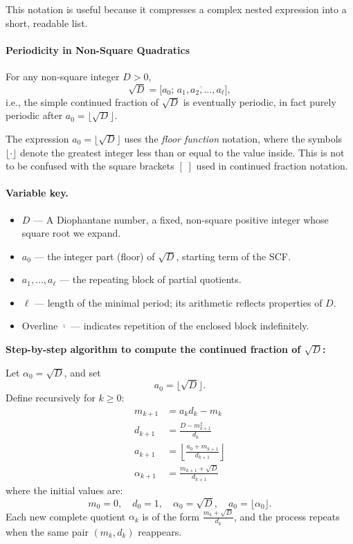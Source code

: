 \documentclass[11pt]{article}
\begin{document}
This notation is useful because it compresses a complex nested expression into a short, readable list.

\paragraph{Periodicity in Non-Square Quadratics}
For any non-square integer $D>0$,
\[
\sqrt{D}=\bigl[a_0;\,\overline{a_1,a_2,\dots,a_\ell}\bigr],
\]
i.e., the simple continued fraction of $\sqrt{D}$ is eventually periodic, in fact purely periodic after $a_0=\lfloor\sqrt{D}\rfloor$.

\smallskip
\noindent
The expression $a_0 = \lfloor \sqrt{D} \rfloor$ uses the \emph{floor function} notation, where the symbols $\lfloor \cdot \rfloor$ denote the greatest integer less than or equal to the value inside. This is not to be confused with the square brackets $[\;]$ used in continued fraction notation.

\paragraph{Variable key.}
\begin{itemize}
  \item $D$ — A Diophantane number, a fixed, non-square positive integer whose square root we expand.
  \item $a_0$ — the integer part (floor) of $\sqrt{D}$, starting term of the SCF.
  \item $a_1,\dots,a_\ell$ — the repeating block of partial quotients.
  \item $\ell$ — length of the minimal period; its arithmetic reflects properties of $D$.
  \item Overline $\overline{\cdot}$ — indicates repetition of the enclosed block indefinitely.
\end{itemize}

\smallskip
\noindent
\textbf{Step-by-step algorithm to compute the continued fraction of \( \sqrt{D} \):}

Let \( \alpha_0 = \sqrt{D} \), and set
\[
a_0 = \lfloor \sqrt{D} \rfloor.
\]
Define recursively for \( k \geq 0 \):
\begin{align*}
m_{k+1} &= a_k d_k - m_k \\
d_{k+1} &= \frac{D - m_{k+1}^2}{d_k} \\
a_{k+1} &= \left\lfloor \frac{a_0 + m_{k+1}}{d_{k+1}} \right\rfloor \\
\alpha_{k+1} &= \frac{m_{k+1} + \sqrt{D}}{d_{k+1}}
\end{align*}
where the initial values are:
\[
m_0 = 0, \quad d_0 = 1, \quad \alpha_0 = \sqrt{D}, \quad a_0 = \lfloor \alpha_0 \rfloor.
\]
Each new complete quotient \( \alpha_k \) is of the form \( \frac{m_k + \sqrt{D}}{d_k} \), and the process repeats when the same pair \( (m_k, d_k) \) reappears.
\end{document}
